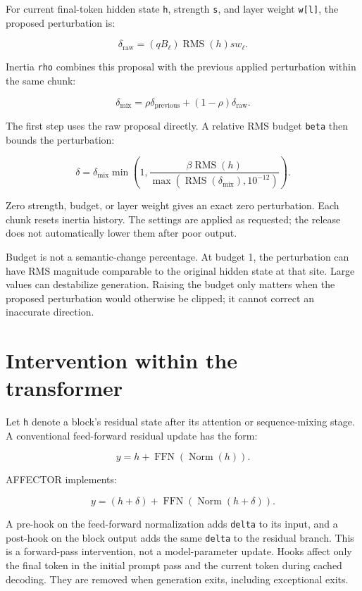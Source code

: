 \documentclass[manuscript,screen,nonacm]{acmart}
\begin{document}
For current final-token hidden state \nolinkurl{h}, strength \nolinkurl{s},
and layer weight \texttt{w{[}l{]}}, the proposed perturbation is:

\[\delta_{\mathrm{raw}}=(q B_\ell)\operatorname{RMS}(h)s w_\ell.\]

Inertia \nolinkurl{rho} combines this proposal with the previous applied
perturbation within the same chunk:

\[\delta_{\mathrm{mix}}=\rho\delta_{\mathrm{previous}}+(1-\rho)\delta_{\mathrm{raw}}.\]

The first step uses the raw proposal directly. A relative RMS budget
\nolinkurl{beta} then bounds the perturbation:

\[\delta=\delta_{\mathrm{mix}}\min\left(1,\frac{\beta\operatorname{RMS}(h)}{\max(\operatorname{RMS}(\delta_{\mathrm{mix}}),10^{-12})}\right).\]

Zero strength, budget, or layer weight gives an exact zero perturbation.
Each chunk resets inertia history. The settings are applied as
requested; the release does not automatically lower them after poor
output.

Budget is not a semantic-change percentage. At budget 1, the
perturbation can have RMS magnitude comparable to the original hidden
state at that site. Large values can destabilize generation. Raising the
budget only matters when the proposed perturbation would otherwise be
clipped; it cannot correct an inaccurate direction.



\section{Intervention within the
transformer}\label{intervention-within-the-transformer}

Let \nolinkurl{h} denote a block's residual state after its attention or
sequence-mixing stage. A conventional feed-forward residual update has
the form:

\[y=h+\operatorname{FFN}(\operatorname{Norm}(h)).\]

AFFECTOR implements:

\[y=(h+\delta)+\operatorname{FFN}(\operatorname{Norm}(h+\delta)).\]

A pre-hook on the feed-forward normalization adds \nolinkurl{delta} to its
input, and a post-hook on the block output adds the same \nolinkurl{delta}
to the residual branch. This is a forward-pass intervention, not a
model-parameter update. Hooks affect only the final token in the initial
prompt pass and the current token during cached decoding. They are
removed when generation exits, including exceptional exits.
\end{document}
